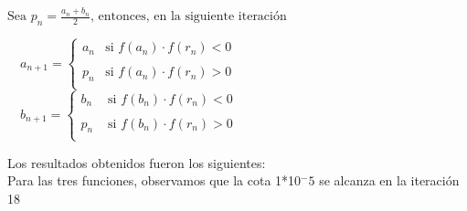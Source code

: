 \documentclass[titlepage,a4paper]{article}
\begin{document}
\smallskip

$\mbox{Sea }p_n = \frac{a_n+b_n}{2}\mbox{, entonces, en la siguiente iteración}$
\begin{center}
    $
    \quad a_{n+1} =\left\{ \begin{array}{lcc}
                 a_n & \mbox{si } f(a_n)\cdot f(r_n) <0 \\
                 \\ p_n & \mbox{si } f(a_n)\cdot f(r_n) > 0 \\
                 \end{array}
       \right. 
    $
    $
    \quad b_{n+1} =\left\{ \begin{array}{lcc}
                 b_n & \mbox{ si } f(b_n)\cdot f(r_n) < 0 \\
                 \\p_n & \mbox{ si } f(b_n)\cdot f(r_n) > 0 \\
                 \end{array}
       \right.
    $
\end{center}
\smallskip
Los resultados obtenidos fueron los siguientes:
\\Para las tres funciones, observamos que la cota 1*10$^-5$ se alcanza en la iteración 18
\end{document}
